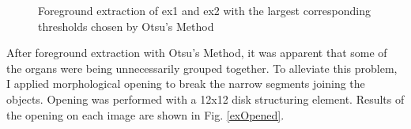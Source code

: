 \documentclass{article}[12 pt]
\begin{document}
\begin{figure}[H]
\captionsetup[subfloat]{labelformat=empty}
\centering
{} 
\caption{Foreground extraction of ex1 and ex2 with the largest corresponding thresholds chosen by Otsu's Method}
\label{exSegmented}
\end{figure}

\noindent
After foreground extraction with Otsu's Method, it was apparent that some of the organs were being unnecessarily grouped together.  To alleviate this problem, I applied morphological opening to break the narrow segments joining the objects.  Opening was performed with a 12x12 disk structuring element.  Results of the opening  on each image are shown in Fig. \ref{exOpened}. 
\end{document}
